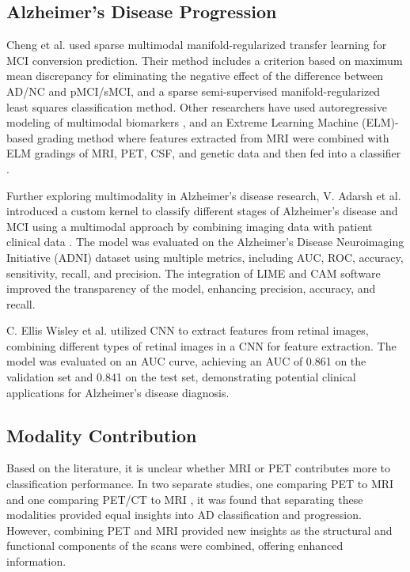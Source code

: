 \subsection{Alzheimer's Disease Progression}
Cheng et al. \cite{cheng_multimodal_2015} used sparse multimodal manifold-regularized transfer learning for MCI conversion prediction. Their method includes a criterion based on maximum mean discrepancy for eliminating the negative effect of the difference between AD/NC and pMCI/sMCI, and a sparse semi-supervised manifold-regularized least squares classification method. Other researchers have used autoregressive modeling of multimodal biomarkers \cite{minhas_predicting_2018}, and an Extreme Learning Machine (ELM)-based grading method where features extracted from MRI were combined with ELM gradings of MRI, PET, CSF, and genetic data and then fed into a classifier \cite{lin_predicting_2020}.

Further exploring multimodality in Alzheimer's disease research, V. Adarsh et al. introduced a custom kernel to classify different stages of Alzheimer’s disease and MCI using a multimodal approach by combining imaging data with patient clinical data \cite{adarsh_multimodal_2024}. The model was evaluated on the Alzheimer’s Disease Neuroimaging Initiative (ADNI) dataset using multiple metrics, including AUC, ROC, accuracy, sensitivity, recall, and precision. The integration of LIME and CAM software improved the transparency of the model, enhancing precision, accuracy, and recall.

C. Ellis Wisley et al. \cite{wisely_convolutional_2022}utilized CNN to extract features from retinal images, combining different types of retinal images in a CNN for feature extraction. The model was evaluated on an AUC curve, achieving an AUC of 0.861 on the validation set and 0.841 on the test set, demonstrating potential clinical applications for Alzheimer's disease diagnosis.

\subsection{Modality Contribution}
Based on the literature, it is unclear whether MRI or PET contributes more to classification performance. In two separate studies, one comparing PET to MRI \cite{wisely_convolutional_2022} and one comparing PET/CT to MRI \cite{zhang_petmr_2017}, it was found that separating these modalities provided equal insights into AD classification and progression. However, combining PET and MRI provided new insights as the structural and functional components of the scans were combined, offering enhanced information. 

